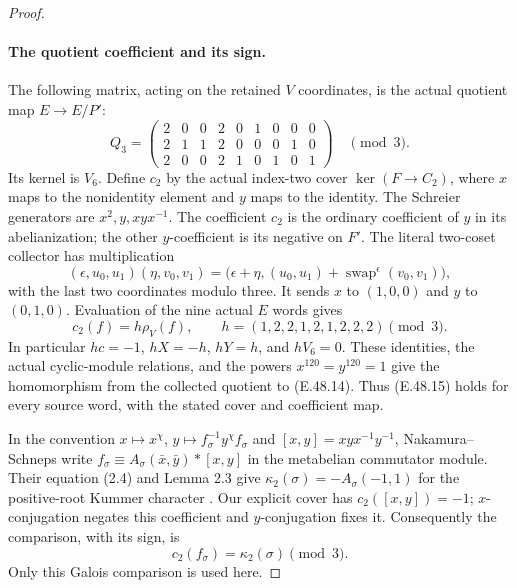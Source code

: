 \begin{proof}
\paragraph{The quotient coefficient and its sign.}
The following matrix, acting on the retained $V$ coordinates,
is the actual quotient map $E\to E/P'$:
\[
 Q_3=\begin{pmatrix}
 2&0&0&2&0&1&0&0&0\\
 2&1&1&2&0&0&0&1&0\\
 2&0&0&2&1&0&1&0&1
 \end{pmatrix}\quad\pmod3.
 \tag{E.48.13}
\]
Its kernel is $V_6$.
Define $c_2$ by the actual index-two cover
$\ker(F\to C_2)$, where $x$ maps to the nonidentity
element and $y$ maps to the identity.
The Schreier generators are $x^2,y,xyx^{-1}$.
The coefficient $c_2$ is the ordinary coefficient of $y$
in its abelianization; the other $y$-coefficient is its
negative on $F'$.
The literal two-coset collector has multiplication
\[
 (\epsilon,u_0,u_1)(\eta,v_0,v_1)
  =\bigl(\epsilon+\eta,
       (u_0,u_1)+\operatorname{swap}^{\epsilon}(v_0,v_1)\bigr),
 \tag{E.48.14}
\]
with the last two coordinates modulo three.
It sends $x$ to $(1,0,0)$ and $y$ to $(0,1,0)$.
Evaluation of the nine actual $E$ words gives
\[
       c_2(f)=h\rho_V(f),\qquad
       h=(1,2,2,1,2,1,2,2,2)\pmod3.
 \tag{E.48.15}
\]
In particular $hc=-1$, $hX=-h$, $hY=h$, and $hV_6=0$.
These identities, the actual cyclic-module relations,
and the powers $x^{120}=y^{120}=1$ give the homomorphism
from the collected quotient to \textup{(E.48.14)}.
Thus \textup{(E.48.15)} holds for every source word,
with the stated cover and coefficient map.

In the convention $x\mapsto x^\chi$,
$y\mapsto f_\sigma^{-1}y^\chi f_\sigma$ and
$[x,y]=xyx^{-1}y^{-1}$, Nakamura--Schneps write
$f_\sigma\equiv A_\sigma(\bar x,\bar y)*[x,y]$
in the metabelian commutator module.
Their equation (2.4) and Lemma 2.3 give
$\kappa_2(\sigma)=-A_\sigma(-1,1)$
for the positive-root Kummer character
\cite[\S2, (2.4), Lemma 2.3]{BCNakamuraSchneps2000}.
Our explicit cover has $c_2([x,y])=-1$;
$x$-conjugation negates this coefficient and
$y$-conjugation fixes it.
Consequently the comparison, with its sign, is
\[
              c_2(f_\sigma)=\kappa_2(\sigma)\pmod3.
 \tag{E.48.16}
\]
Only this Galois comparison is used here.


\end{proof}
